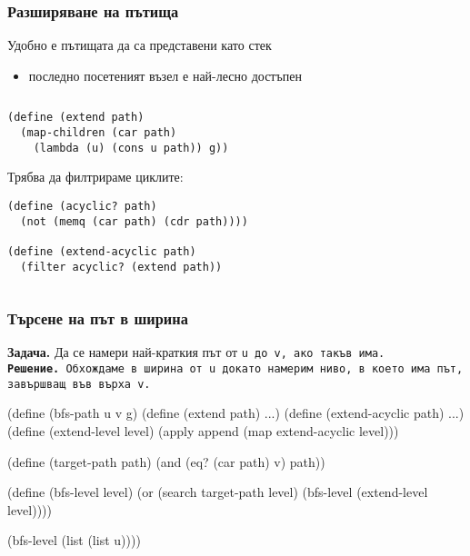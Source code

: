\documentclass{beamer}
\begin{document}
\begin{frame}[fragile]
  \frametitle{Разширяване на пътища}
  Удобно е пътищата да са представени като \alert{стек}
  \begin{itemize}
  \item последно посетеният възел е най-лесно достъпен
  \end{itemize}
  \pause
  \begin{columns}[T]
    \begin{column}{0.65\textwidth}
      \pause
\begin{verbatim}
(define (extend path)
  (map-children (car path)
    (lambda (u) (cons u path)) g))
\end{verbatim}
      \pause
      Трябва да филтрираме циклите:
      \pause
\begin{verbatim}
(define (acyclic? path)
  (not (memq (car path) (cdr path))))

(define (extend-acyclic path)
  (filter acyclic? (extend path))
\end{verbatim}
    \end{column}
    \begin{column}{0.35\textwidth}
      \samplegraph
    \end{column}
  \end{columns}
\end{frame}

\begin{frame}[fragile]
  \frametitle{Търсене на път в ширина}
  \textbf{Задача.} Да се намери \alert{най-краткия} път от \tt u до \tt v, ако такъв има.\\
  \pause
  \textbf{Решение.} Обхождаме в ширина от \tt u докато намерим ниво, в което има път, завършващ във върха  \tt v.
  \pause
  \small
\begin{semiverbatim}
(define (bfs-path u v g)
  \textcolor{black!20}{(define (extend path) ...)
  (define (extend-acyclic path) ...)}
  (define (extend-level level)
    (apply append (map extend-acyclic level)))

  (define (target-path path)
    (and (eq? (car path) v) path))

  (define (bfs-level level)
    (or (search target-path level)
        (bfs-level (extend-level level))))

  (bfs-level (list (list u))))
\end{semiverbatim}
\end{frame}
\end{document}
